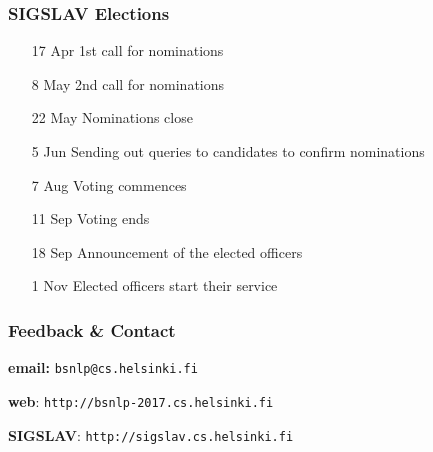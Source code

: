 \documentclass{beamer}
\begin{document}
\begin{frame}[fragile]
 \frametitle{SIGSLAV Elections}

\begin{itemize}

	\item[17 Apr] 1st call for nominations

	\item[8 May] 2nd call for nominations

	\item[22 May] Nominations close

	\item[5 Jun] Sending out queries to candidates to confirm nominations

	\item[7 Aug] Voting commences

	\item[11 Sep] Voting ends

	\item[18 Sep] Announcement of the elected officers

	\item[1 Nov] Elected officers start their service

\end{itemize}

\end{frame}



\begin{frame}[fragile]
 \frametitle{Feedback \& Contact}

\textbf{email:} {\color{blue} \large{\verb+bsnlp@cs.helsinki.fi+}}

\vspace{1cm}

\textbf{web}: {\color{blue} \large{\verb+http://bsnlp-2017.cs.helsinki.fi+}}

\vspace{1cm}

\textbf{SIGSLAV}: {\color{blue} \large{\verb+http://sigslav.cs.helsinki.fi+}}


\end{frame}
\end{document}
